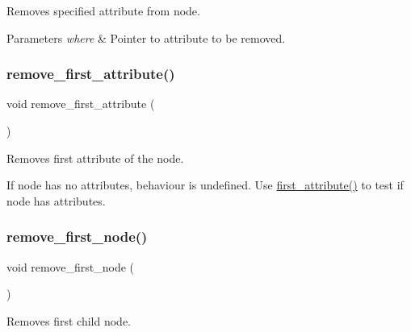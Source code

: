 Removes specified attribute from node. 


\begin{DoxyParams}{Parameters}
{\em where} & Pointer to attribute to be removed. \\
\hline
\end{DoxyParams}
\mbox{\label{classrapidxml_1_1xml__node_a4eea4a7f6cb484ca9944f7eafe6e1843}} 
\subsubsection{\texorpdfstring{remove\+\_\+first\+\_\+attribute()}{remove\_first\_attribute()}}
{\footnotesize\ttfamily void remove\+\_\+first\+\_\+attribute (\begin{DoxyParamCaption}{ }\end{DoxyParamCaption})\hspace{0.3cm}{\ttfamily [inline]}}



Removes first attribute of the node. 

If node has no attributes, behaviour is undefined. Use \mbox{\hyperlink{classrapidxml_1_1xml__node_a3cbbee0d76d96c3315cc9d80d169c8d9}{first\+\_\+attribute()}} to test if node has attributes. \mbox{\label{classrapidxml_1_1xml__node_a9a31d861e1bddc710839c551a5d2b3a4}} 
\subsubsection{\texorpdfstring{remove\+\_\+first\+\_\+node()}{remove\_first\_node()}}
{\footnotesize\ttfamily void remove\+\_\+first\+\_\+node (\begin{DoxyParamCaption}{ }\end{DoxyParamCaption})\hspace{0.3cm}{\ttfamily [inline]}}



Removes first child node. 

